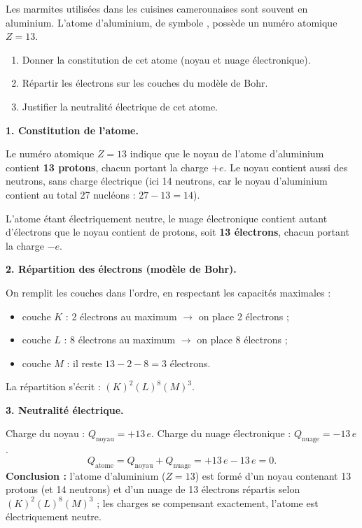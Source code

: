 \documentclass[11pt]{article}
\begin{document}
\begin{exoresolu}
Les marmites utilisées dans les cuisines camerounaises sont souvent en aluminium. L'atome d'aluminium, de symbole , possède un numéro atomique $Z = 13$.
\begin{enumerate}
\item Donner la constitution de cet atome (noyau et nuage électronique).
\item Répartir les électrons sur les couches du modèle de Bohr.
\item Justifier la neutralité électrique de cet atome.
\end{enumerate}
\tcblower
\textbf{1. Constitution de l'atome.}

Le numéro atomique $Z = 13$ indique que le noyau de l'atome d'aluminium contient \textbf{13 protons}, chacun portant la charge $+e$. Le noyau contient aussi des neutrons, sans charge électrique (ici 14 neutrons, car le noyau d'aluminium contient au total 27 nucléons : $27 - 13 = 14$).

L'atome étant électriquement neutre, le nuage électronique contient autant d'électrons que le noyau contient de protons, soit \textbf{13 électrons}, chacun portant la charge $-e$.

\textbf{2. Répartition des électrons (modèle de Bohr).}

On remplit les couches dans l'ordre, en respectant les capacités maximales :
\begin{itemize}
\item couche $K$ : 2 électrons au maximum $\rightarrow$ on place 2 électrons ;
\item couche $L$ : 8 électrons au maximum $\rightarrow$ on place 8 électrons ;
\item couche $M$ : il reste $13 - 2 - 8 = 3$ électrons.
\end{itemize}
La répartition s'écrit : $(K)^2 (L)^8 (M)^3$.

\textbf{3. Neutralité électrique.}

Charge du noyau : $Q_{\text{noyau}} = +13\,e$. Charge du nuage électronique : $Q_{\text{nuage}} = -13\,e$.
\[ Q_{\text{atome}} = Q_{\text{noyau}} + Q_{\text{nuage}} = +13\,e - 13\,e = 0. \]
\textbf{Conclusion :} l'atome d'aluminium  ($Z = 13$) est formé d'un noyau contenant 13 protons (et 14 neutrons) et d'un nuage de 13 électrons répartis selon $(K)^2 (L)^8 (M)^3$ ; les charges se compensant exactement, l'atome est électriquement neutre.
\end{exoresolu}
\end{document}
